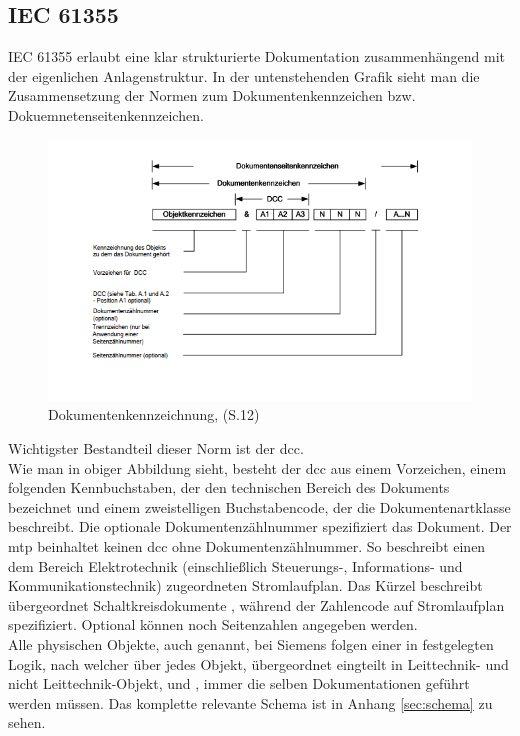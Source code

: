 \subsection{IEC 61355}
\label{sub:61355}
%
IEC 61355 erlaubt eine klar strukturierte Dokumentation zusammenhängend mit der eigenlichen Anlagenstruktur.
In der untenstehenden Grafik sieht man die Zusammensetzung der Normen zum Dokumentenkennzeichen bzw. Dokuemnetenseitenkennzeichen.
\begin{figure}[H]
   \begin{center}
   \includegraphics[width=1.1\textwidth]{Bilder/dokukennzeichen} 
   \caption{Dokumentenkennzeichnung, \cite{4}(S.12)} 
   \label{fig:dokk} 
   \end{center}
\end{figure}
Wichtigster Bestandteil dieser Norm ist der \ac{dcc}.\\
Wie man in obiger Abbildung sieht, besteht der \ac{dcc} aus einem Vorzeichen, einem folgenden Kennbuchstaben, der den technischen Bereich des Dokuments bezeichnet und einem zweistelligen Buchstabencode, der die Dokumentenartklasse beschreibt. Die optionale Dokumentenzählnummer spezifiziert das Dokument. Der \ac{mtp} beinhaltet keinen \ac{dcc} ohne Dokumentenzählnummer. So beschreibt  einen dem Bereich Elektrotechnik (einschließlich Steuerungs-, Informations- und Kommunikationstechnik) zugeordneten Stromlaufplan. Das Kürzel  beschreibt übergeordnet Schaltkreisdokumente , während der Zahlencode  auf Stromlaufplan spezifiziert.
Optional können noch Seitenzahlen angegeben werden.\\
Alle physischen Objekte, auch  genannt, bei Siemens folgen einer in \cite[S.47]{12} festgelegten Logik, nach welcher über jedes Objekt, übergeordnet eingteilt in Leittechnik- und nicht Leittechnik-Objekt,  und , immer die selben Dokumentationen geführt werden müssen. Das komplette relevante Schema ist in Anhang \ref{sec:schema} zu sehen.
